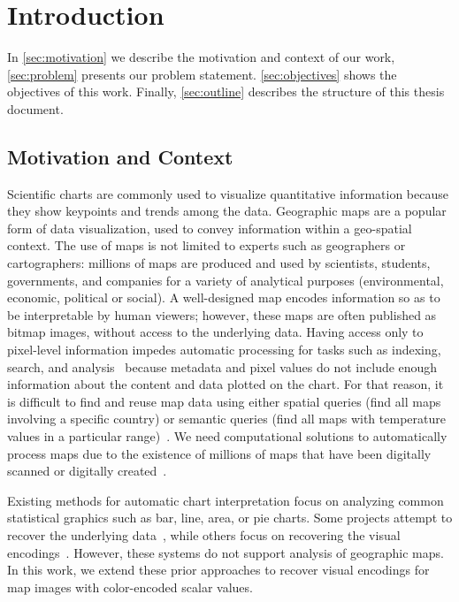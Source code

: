 \chapter{Introduction}
\label{ch:intro}
In \autoref{sec:motivation} we describe the motivation and context of our work, \autoref{sec:problem} presents our problem statement. \autoref{sec:objectives} shows the objectives of this work. Finally, \autoref{sec:outline} describes the structure of this thesis document.


\section{Motivation and Context}
\label{sec:motivation}
Scientific charts are commonly used to visualize quantitative information because they show keypoints and trends among the data.
Geographic maps are a popular form of data visualization, used to convey information within a geo-spatial context. The use of maps is not limited to experts such as geographers or cartographers: millions of maps are produced and used by scientists, students, governments, and companies for a variety of analytical purposes (\eg environmental, economic, political or social). A well-designed map encodes information so as to be interpretable by human viewers; however, these maps are often published as bitmap images, without access to the underlying data. Having access only to pixel-level information impedes automatic processing for tasks such as indexing, search, and analysis~\citep{Jung2017, Siegel2016} because metadata and pixel values do not include enough information about the content and data plotted on the chart. 
For that reason, it is difficult to find and reuse map data using either spatial queries (\eg find all maps involving a specific country) or semantic queries (\eg find all maps with temperature values in a particular range)~\citep{Walter2013}. We need computational solutions to automatically process maps due to the existence of millions of maps that have been digitally scanned or digitally created~\citep{Chiang2014}.

Existing methods for automatic chart interpretation focus on analyzing common statistical graphics such as bar, line, area, or pie charts. Some projects attempt to recover the underlying data~\citep{Savva2011, Gao2012, Al-Zaidy2015, Al-Zaidy2016, Jung2017, Siegel2016, Tummers2006}, while others focus on recovering the visual encodings~\citep{Harper2014, Poco2017}. However, these systems do not support analysis of geographic maps. In this work, we extend these prior approaches to recover visual encodings for map images with color-encoded scalar values.

